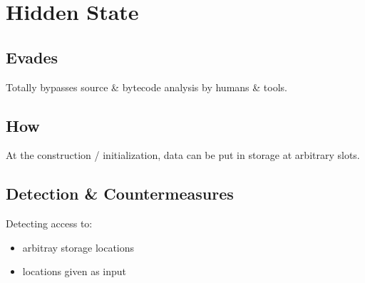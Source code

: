 \section{Hidden State}

\subsection{Evades}

Totally bypasses source \& bytecode analysis by humans \& tools.

\subsection{How}

At the construction / initialization, data can be put in storage at arbitrary slots.

\subsection{Detection \& Countermeasures}

Detecting access to:

\begin{itemize}
\item{arbitray storage locations}
\item{locations given as input}
\end{itemize}
